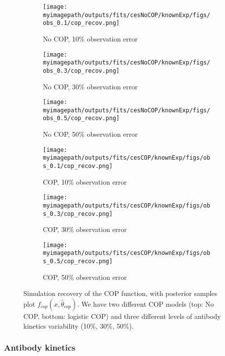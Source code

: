 \documentclass{article}
\newcommand{\myimagepath}{/Users/davidhodgson/Dropbox/Mac (3)/Documents/research/Rpackages/rjmc/}
\begin{document}
\begin{figure}[H]
\label{fit1:cop}
    \centering
    \begin{subfigure}{0.31\textwidth}
        \centering
        \texttt{[image: \\myimagepath/outputs/fits/cesNoCOP/knownExp/figs/obs\_0.1/cop\_recov.png]}
        \caption{No COP, 10\% observation error}
    \end{subfigure}
    \begin{subfigure}{0.31\textwidth}
        \centering
        \texttt{[image: \\myimagepath/outputs/fits/cesNoCOP/knownExp/figs/obs\_0.3/cop\_recov.png]}
        \caption{No COP, 30\% observation error}
    \end{subfigure}
    \begin{subfigure}{0.31\textwidth}
        \centering
        \texttt{[image: \\myimagepath/outputs/fits/cesNoCOP/knownExp/figs/obs\_0.5/cop\_recov.png]}
        \caption{No COP, 50\% observation error}
    \end{subfigure}
    
  \begin{subfigure}{0.31\textwidth}
        \centering
        \texttt{[image: \\myimagepath/outputs/fits/cesCOP/knownExp/figs/obs\_0.1/cop\_recov.png]}
        \caption{ COP, 10\% observation error}
    \end{subfigure}
    \begin{subfigure}{0.31\textwidth}
        \centering
        \texttt{[image: \\myimagepath/outputs/fits/cesCOP/knownExp/figs/obs\_0.3/cop\_recov.png]}
        \caption{ COP, 30\% observation error}
    \end{subfigure}
    \begin{subfigure}{0.31\textwidth}
        \centering
        \texttt{[image: \\myimagepath/outputs/fits/cesCOP/knownExp/figs/obs\_0.5/cop\_recov.png]}
        \caption{ COP, 50\% observation error}
    \end{subfigure}
    
    \caption{Simulation recovery of the COP function, with posterior samples plot  $f_{cop}(x, \hat{\theta}_{cop})$. We have two different COP models (top: No COP, bottom: logistic COP) and three different levels of antibody kinetics variability (10\%, 30\%, 50\%).}
    \end{figure}


\subsubsection{Antibody kinetics}
\end{document}
